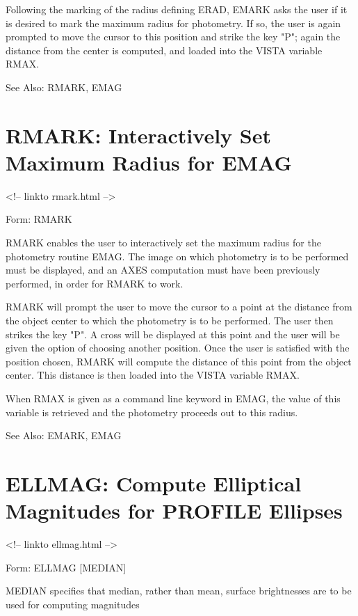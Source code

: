 Following the marking of the radius defining ERAD, EMARK asks the user if
it is desired to mark the maximum radius for photometry. If so, the user is
again prompted to move the cursor to this position and strike the key "P";
again the distance from the center is computed, and loaded into the VISTA
variable RMAX.

See Also: RMARK, EMAG


\section{RMARK: Interactively Set Maximum Radius for EMAG}
\begin{rawhtml}
<!-- linkto rmark.html -->
\end{rawhtml}
\begin{command}
  \item[Form: RMARK\hfill]{}
\end{command}

RMARK enables the user to interactively set the maximum radius for the
photometry routine EMAG. The image on which photometry is to be performed
must be displayed, and an AXES computation must have been previously
performed, in order for RMARK to work.
 
RMARK will prompt the user to move the cursor to a point at the distance
from the object center to which the photometry is to be performed. The user
then strikes the key "P". A cross will be displayed at this point and the
user will be given the option of choosing another position. Once the user
is satisfied with the position chosen, RMARK will compute the distance of
this point from the object center. This distance is then loaded into the
VISTA variable RMAX.

When RMAX is given as a command line keyword in EMAG, the value of this
variable is retrieved and the photometry proceeds out to this radius.

See Also: EMARK, EMAG


\section{ELLMAG: Compute Elliptical Magnitudes for PROFILE Ellipses}
\begin{rawhtml}
<!-- linkto ellmag.html -->
\end{rawhtml}
\begin{command}
  \item[Form: ELLMAG {[MEDIAN]}\hfill]{}
  \item[MEDIAN]{specifies that median, rather than mean, surface
       brightnesses are to be used for computing magnitudes}
\end{command}

